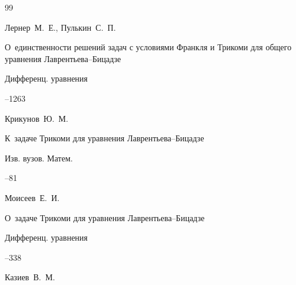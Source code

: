 \begin{thebibliography}{99}

\by Лернер~М.~Е., Пулькин~С.~П.

\paper О~единственности решений задач с условиями Франкля и Трикоми для общего уравнения Лаврентьева--Бицадзе

\jour Дифференц. уравнения




--1263









\by Крикунов~Ю.~М.

\paper К~задаче Трикоми для уравнения Лаврентьева--Бицадзе

\jour Изв. вузов. Матем.



--81









\by Моисеев~Е.~И.

\paper О~задаче Трикоми для уравнения Лаврентьева--Бицадзе

\jour Дифференц. уравнения




--338







\by Казиев~В.~М.


\end{thebibliography}

